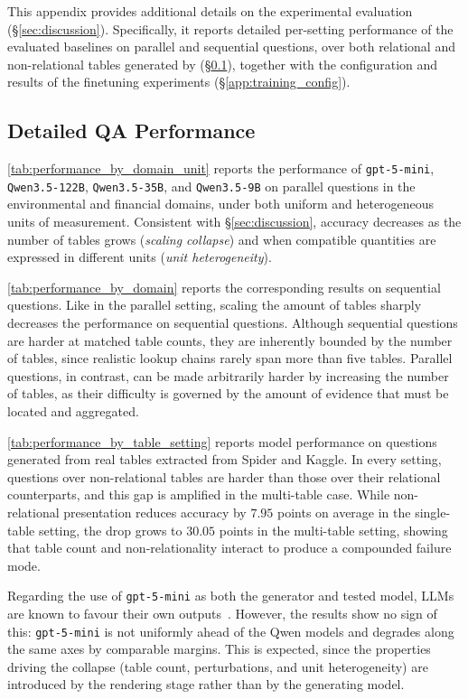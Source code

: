 This appendix provides additional details on the experimental evaluation
(\S\ref{sec:discussion}). Specifically, it reports detailed per-setting
performance of the evaluated baselines on parallel and sequential
questions, over both relational and non-relational tables generated by
\name{} (\S\ref{sec:detailed_exp}), together with the configuration and
results of the finetuning experiments (\S\ref{app:training_config}).

\subsection{Detailed QA Performance}
\label{sec:detailed_exp}

\autoref{tab:performance_by_domain_unit} reports the performance of
\texttt{gpt-5-mini}, \texttt{Qwen3.5-122B}, \texttt{Qwen3.5-35B}, and
\texttt{Qwen3.5-9B} on parallel questions in the environmental and
financial domains, under both uniform and heterogeneous units of
measurement. Consistent with \S\ref{sec:discussion}, accuracy decreases
as the number of tables grows (\emph{scaling collapse}) and when
compatible quantities are expressed in different units
(\emph{unit heterogeneity}).

\autoref{tab:performance_by_domain} reports the corresponding results on
sequential questions. Like in the parallel setting, scaling the amount of tables sharply decreases the performance on sequential questions. 
Although sequential questions are harder at matched
table counts, they are inherently bounded by the number of tables, since
realistic lookup chains rarely span more than five tables. Parallel
questions, in contrast, can be made arbitrarily harder by increasing the
number of tables, as their difficulty is governed by the amount of
evidence that must be located and aggregated.

\autoref{tab:performance_by_table_setting} reports model performance on
questions generated from real tables extracted from Spider and Kaggle.
In every setting, questions over non-relational tables are harder than
those over their relational counterparts, and this gap is amplified in
the multi-table case. While non-relational presentation reduces accuracy
by $7.95$ points on average in the single-table setting, the drop grows to
$30.05$ points in the multi-table setting, showing that table count and
non-relationality interact to produce a compounded failure mode.

Regarding the use of \texttt{gpt-5-mini} as both the generator and tested model, LLMs are known to favour their own outputs~\cite{selfpreference}. However, the results show no sign of this: \texttt{gpt-5-mini} is not uniformly ahead of the Qwen models and degrades along the same axes by comparable margins. This is expected, since the properties driving the collapse (table count, perturbations, and unit heterogeneity) are introduced by the rendering stage rather than by the generating model.

